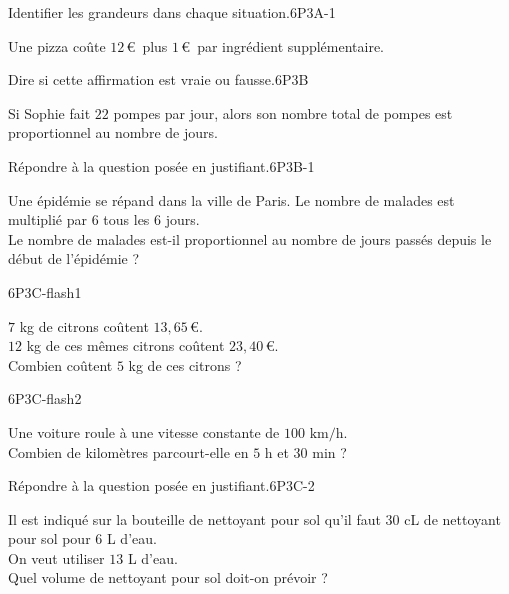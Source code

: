 \documentclass[a4paper,11pt,fleqn]{article}
\begin{document}
\begin{EXO}{Identifier les grandeurs dans chaque situation.}{6P3A-1}

 Une pizza coûte $12$\,\euro{}~plus $1$\,\euro{}~par ingrédient supplémentaire.
\end{EXO}

\begin{EXO}{Dire si cette affirmation est vraie ou fausse.}{6P3B}

 Si Sophie fait $22$ pompes par jour, alors son nombre total de pompes est proportionnel au nombre de jours.
\end{EXO}

\begin{EXO}{Répondre à la question posée en justifiant.}{6P3B-1}

 Une épidémie se répand dans la ville de Paris. Le nombre de malades est multiplié par 6 tous les 6 jours.\\Le nombre de malades est-il proportionnel au nombre de jours passés depuis le début de l'épidémie ?\\
\end{EXO}

\begin{EXO}{}{6P3C-flash1}

 $7$ kg de citrons coûtent $13{,}65$\,\euro{}.\\ $12$ kg de ces mêmes citrons coûtent $23{,}40$\,\euro{}.\\
    Combien coûtent $5$ kg de ces citrons ?
\end{EXO}

\begin{EXO}{}{6P3C-flash2}

 Une voiture roule à une vitesse constante de $100\text{ km/h}$. \\
    
    Combien de kilomètres parcourt-elle en $5$ h et $30$ min ?
\end{EXO}

\begin{EXO}{Répondre à la question posée en justifiant.}{6P3C-2}

 Il est indiqué sur la bouteille de nettoyant pour sol qu'il faut  $30$ cL de  nettoyant pour sol pour $6$ L d'eau.\\ On veut utiliser $13$ L d'eau.\\ Quel volume de nettoyant pour sol doit-on prévoir ? 
\end{EXO}
\end{document}
